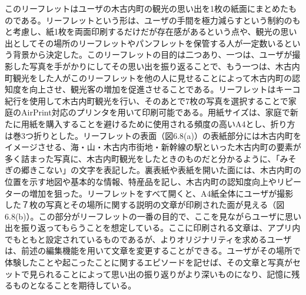このリーフレットはユーザの木古内町の観光の思い出を1枚の紙面にまとめたものである。リーフレットという形は、ユーザの手間を極力減らすという制約のもと考慮し、紙1枚を両面印刷するだけだが存在感があるという点や、観光の思い出としてその場所のリーフレットやパンフレットを保管する人が一定数いるという背景から決定した。このリーフレットの目的は二つあり、一つは、ユーザが撮影した写真を手がかりにしてその思い出を振り返ることで、もう一つは、木古内町観光をした人がこのリーフレットを他の人に見せることによって木古内町の認知度を向上させ、観光客の増加を促進させることである。リーフレットはキーコ紀行を使用して木古内町観光を行い、そのあとで7枚の写真を選択することで家庭のAirPrint対応のプリンタを用いて印刷可能である。用紙サイズは、家庭で新たに用紙を購入することを避けるために使用される頻度の高いA4とし、折り方は巻3つ折りとした。リーフレットの表面（図6.8(a)）の表紙部分には木古内町をイメージさせる、海・山・木古内市街地・新幹線の駅といった木古内町の要素が多く詰まった写真に、木古内町観光をしたときのものだと分かるように、「みそぎの郷きこない」の文字を表記した。裏表紙や表紙を開いた面には、木古内町の位置を示す地図や基本的な情報、特産品を記し、木古内町の認知度向上やリピーターの増加を狙った。リーフレットをすべて開くと、A4紙全体にユーザが撮影した７枚の写真とその場所に関する説明の文章が印刷された面が見える（図6.8(b)）。この部分がリーフレットの一番の目的で、ここを見ながらユーザに思い出を振り返ってもらうことを想定している。ここに印刷される文章は、アプリ内でもともと設定されているものであるが、よりオリジナリティを求めるユーザは、前述の編集機能を用いて文章を変更することができる。ユーザがその場所で体験したことや起こったことに関するエピソードを記せば、その文章と写真がセットで見られることによって思い出の振り返りがより深いものになり、記憶に残るものとなることを期待している。

